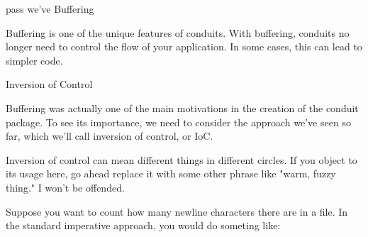 % 
pass
we've
% 
Buffering

Buffering is one of the unique features of conduits. With buffering, conduits no longer
need to
control the flow of your application. In some cases, this can lead to simpler code.

Inversion of Control

Buffering was actually one of the main motivations in the creation of the
conduit package. To see its importance, we need to consider the approach we've
seen so far, which we'll call inversion of control, or IoC.

Inversion of control can mean different things in different circles. If you object to its
usage here, go ahead replace it with some other phrase like "warm, fuzzy thing." I won't
be
offended.

Suppose you want to count how many newline characters there are in a file. In the standard
imperative approach, you would do someting like:

